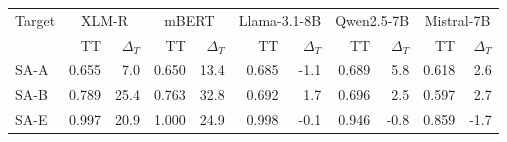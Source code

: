 \begin{tabular}{lrrrrrrrrrr}
\toprule
Target & \multicolumn{2}{c}{XLM-R} & \multicolumn{2}{c}{mBERT} & \multicolumn{2}{c}{Llama-3.1-8B} & \multicolumn{2}{c}{Qwen2.5-7B} & \multicolumn{2}{c}{Mistral-7B} \\
 & TT & $\Delta_T$ & TT & $\Delta_T$ & TT & $\Delta_T$ & TT & $\Delta_T$ & TT & $\Delta_T$ \\
\midrule
SA-A & 0.655 & 7.0 & 0.650 & 13.4 & 0.685 & -1.1 & 0.689 & 5.8 & 0.618 & 2.6 \\
SA-B & 0.789 & 25.4 & 0.763 & 32.8 & 0.692 & 1.7 & 0.696 & 2.5 & 0.597 & 2.7 \\
SA-E & 0.997 & 20.9 & 1.000 & 24.9 & 0.998 & -0.1 & 0.946 & -0.8 & 0.859 & -1.7 \\
\bottomrule
\end{tabular}
